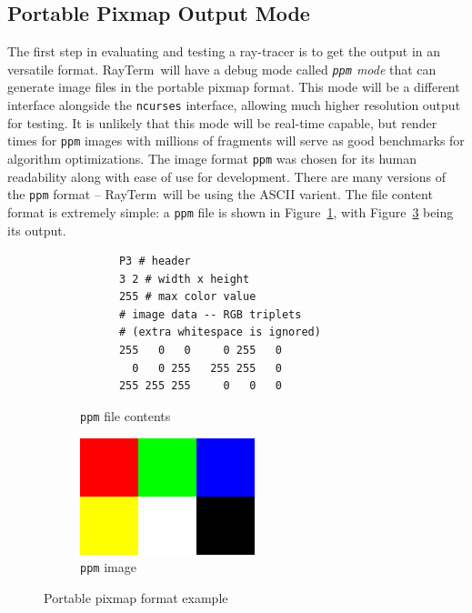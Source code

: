 \documentclass[11pt]{article}
\newcommand{\name}{{\sc RayTerm}}
\begin{document}
\subsection{Portable Pixmap Output Mode}
\label{sec:evaluate:ppm_mode}

The first step in evaluating and testing a ray-tracer is to get the output in an versatile format.
\name\ will have a debug mode called {\it \texttt{ppm} mode} that can generate image files in the portable pixmap format.
This mode will be a different interface alongside the \texttt{ncurses} interface, allowing much higher resolution output for testing.
It is unlikely that this mode will be real-time capable, but render times for \texttt{ppm} images with millions of fragments will serve as good benchmarks for algorithm optimizations.
The image format \texttt{ppm} was chosen for its human readability along with ease of use for development.
There are many versions of the \texttt{ppm} format -- \name\ will be using the ASCII varient.
The file content format is extremely simple: a \texttt{ppm} file is shown in Figure~\ref{fig:ppm_code}, with Figure~\ref{fig:ppm_image} being its output.

\begin{figure}[htb]
  \begin{subfigure}[htb]{0.5\textwidth}
    \small
    \vspace{2.6em}
    \begin{verbatim}
      P3 # header
      3 2 # width x height
      255 # max color value
      # image data -- RGB triplets
      # (extra whitespace is ignored)
      255   0   0     0 255   0
        0   0 255   255 255   0
      255 255 255     0   0   0
    \end{verbatim}
    \caption{\texttt{ppm} file contents}
    \label{fig:ppm_code}
  \end{subfigure}
  \begin{subfigure}[htb]{0.5\textwidth}
    \includegraphics[width=\textwidth]{resources/ppm_example}
    \caption{\texttt{ppm} image}
    \label{fig:ppm_image}
  \end{subfigure}
  \caption{Portable pixmap format example}
\end{figure}
\end{document}
